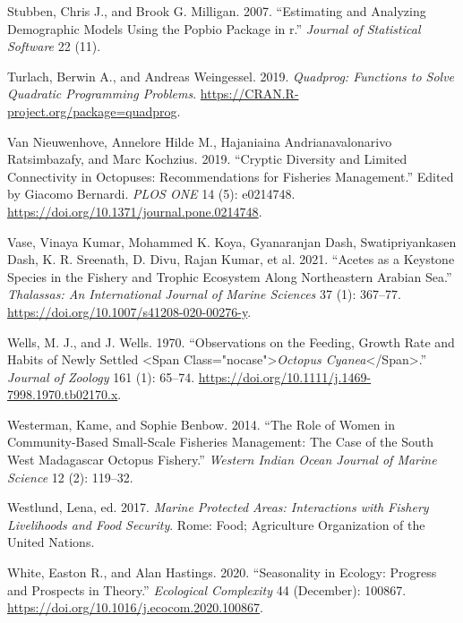 \documentclass[
]{article}
\newlength{\cslhangindent}
\newlength{\cslentryspacingunit} %
\newenvironment{CSLReferences}[2] %
 {%
  \setlength{\parindent}{0pt}
  \ifodd #1
  \let\oldpar\par
  \def\par{\hangindent=\cslhangindent\oldpar}
  \fi
  \setlength{\parskip}{#2\cslentryspacingunit}
 }%
 {}
\begin{document}
\begin{CSLReferences}{1}{0}
\leavevmode{}%
Stubben, Chris J., and Brook G. Milligan. 2007. {``Estimating and Analyzing Demographic Models Using the Popbio Package in r.''} \emph{Journal of Statistical Software} 22 (11).

\leavevmode{}%
Turlach, Berwin A., and Andreas Weingessel. 2019. \emph{Quadprog: Functions to Solve Quadratic Programming Problems}. \url{https://CRAN.R-project.org/package=quadprog}.

\leavevmode{}%
Van Nieuwenhove, Annelore Hilde M., Hajaniaina Andrianavalonarivo Ratsimbazafy, and Marc Kochzius. 2019. {``Cryptic Diversity and Limited Connectivity in Octopuses: {Recommendations} for Fisheries Management.''} Edited by Giacomo Bernardi. \emph{PLOS ONE} 14 (5): e0214748. \url{https://doi.org/10.1371/journal.pone.0214748}.

\leavevmode{}%
Vase, Vinaya Kumar, Mohammed K. Koya, Gyanaranjan Dash, Swatipriyankasen Dash, K. R. Sreenath, D. Divu, Rajan Kumar, et al. 2021. {``Acetes as a {Keystone} {Species} in the {Fishery} and {Trophic} {Ecosystem} {Along} {Northeastern} {Arabian} {Sea}.''} \emph{Thalassas: An International Journal of Marine Sciences} 37 (1): 367--77. \url{https://doi.org/10.1007/s41208-020-00276-y}.

\leavevmode{}%
Wells, M. J., and J. Wells. 1970. {``Observations on the Feeding, Growth Rate and Habits of Newly Settled {\textless{}}Span Class="nocase"{\textgreater{}}\emph{{Octopus} Cyanea}{\textless{}}/Span{\textgreater{}}.''} \emph{Journal of Zoology} 161 (1): 65--74. \url{https://doi.org/10.1111/j.1469-7998.1970.tb02170.x}.

\leavevmode{}%
Westerman, Kame, and Sophie Benbow. 2014. {``The {Role} of {Women} in {Community}-Based {Small}-{Scale} {Fisheries} {Management}: {The} {Case} of the {South} {West} {Madagascar} {Octopus} {Fishery}.''} \emph{Western Indian Ocean Journal of Marine Science} 12 (2): 119--32.

\leavevmode{}%
Westlund, Lena, ed. 2017. \emph{Marine Protected Areas: Interactions with Fishery Livelihoods and Food Security}. Rome: Food; Agriculture Organization of the United Nations.

\leavevmode{}%
White, Easton R., and Alan Hastings. 2020. {``Seasonality in Ecology: {Progress} and Prospects in Theory.''} \emph{Ecological Complexity} 44 (December): 100867. \url{https://doi.org/10.1016/j.ecocom.2020.100867}.

\end{CSLReferences}
\end{document}
